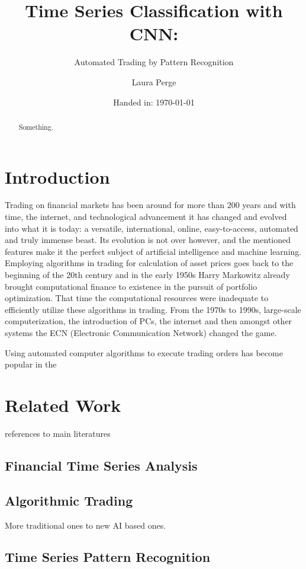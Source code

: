 \documentclass[11pt, a4paper]{article}
\author{Laura Perge}
\title{Time Series Classification with CNN:}
\subtitle{ Automated Trading by Pattern Recognition}
\date{Handed in: \today}
\begin{document}
\maketitle

\tableofcontents

\begin{abstract}
    Something.
\end{abstract}

\section{Introduction}
Trading on financial markets has been around for more than 200 years and with time, the internet, and technological advancement it has changed and evolved into what it is today:  
a versatile, international, online, easy-to-access, automated and truly immense beast. Its evolution is not over however, and the mentioned features make it the perfect subject 
of artificial intelligence and machine learning. 
Employing algorithms in trading for calculation of asset prices goes back to the beginning of the 20th century and in the early 1950s Harry Markowitz already brought computational finance 
to existence in the pursuit of portfolio optimization. That time the computational resources were inadequate to efficiently utilize these algorithms in trading. From the 1970s to 1990s, 
large-scale computerization, the introduction of PCs, the internet and then amongst other systems the ECN (Electronic Communication Network) changed the game. 

Using automated computer algorithms to execute trading orders has become popular in the  


\section{Related Work}

references to main literatures
\subsection{Financial Time Series Analysis}
\subsection{Algorithmic Trading}
More traditional ones to new AI based ones.
\subsection{Time Series Pattern Recognition}
\end{document}

